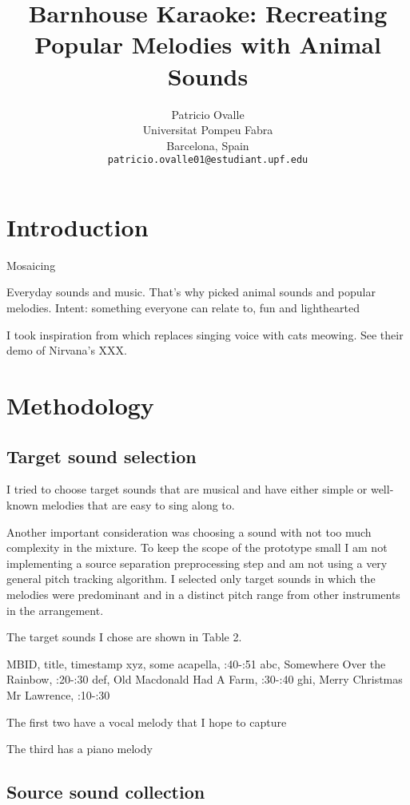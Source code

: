 \documentclass{article}
\title{Barnhouse Karaoke: Recreating Popular Melodies with Animal Sounds}
\date{}
\author{
	Patricio Ovalle \\
	Universitat Pompeu Fabra\\
	Barcelona, Spain \\
	\texttt{patricio.ovalle01@estudiant.upf.edu}
}
\begin{document}
\maketitle


\begin{abstract}

\end{abstract}


\section{Introduction}

Mosaicing

Everyday sounds and music. That’s why picked animal sounds and popular melodies. Intent: something everyone can relate to, fun and lighthearted

I took inspiration from 
\citet{} which replaces singing voice with cats meowing. See their demo of Nirvana’s XXX. 

\section{Methodology}

\subsection{Target sound selection}

I tried to choose target sounds that are musical and have either simple or well-known melodies that are easy to sing along to.

Another important consideration was choosing a sound with not too much complexity in the mixture. To keep the scope of the prototype small I am not implementing a source separation preprocessing step and am not using a very general pitch tracking algorithm. I selected only target sounds in which the melodies were predominant and in a distinct pitch range from other instruments in the arrangement.

The target sounds I chose are shown in Table 2.

MBID, title, timestamp
xyz, some acapella, :40-:51
abc, Somewhere Over the Rainbow, :20-:30
def, Old Macdonald Had A Farm, :30-:40
ghi, Merry Christmas Mr Lawrence, :10-:30

The first two have a vocal melody that I hope to capture

The third has a piano melody


\subsection{Source sound collection}
\end{document}
